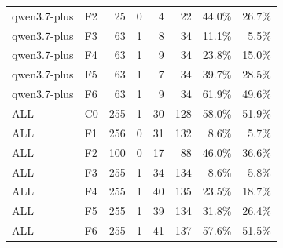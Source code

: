\begin{tabular}{llrrrrrr}
qwen3.7-plus & F2 & 25 & 0 & 4 & 22 & 44.0\% & 26.7\% \\
qwen3.7-plus & F3 & 63 & 1 & 8 & 34 & 11.1\% & 5.5\% \\
qwen3.7-plus & F4 & 63 & 1 & 9 & 34 & 23.8\% & 15.0\% \\
qwen3.7-plus & F5 & 63 & 1 & 7 & 34 & 39.7\% & 28.5\% \\
qwen3.7-plus & F6 & 63 & 1 & 9 & 34 & 61.9\% & 49.6\% \\
ALL & C0 & 255 & 1 & 30 & 128 & 58.0\% & 51.9\% \\
ALL & F1 & 256 & 0 & 31 & 132 & 8.6\% & 5.7\% \\
ALL & F2 & 100 & 0 & 17 & 88 & 46.0\% & 36.6\% \\
ALL & F3 & 255 & 1 & 34 & 134 & 8.6\% & 5.8\% \\
ALL & F4 & 255 & 1 & 40 & 135 & 23.5\% & 18.7\% \\
ALL & F5 & 255 & 1 & 39 & 134 & 31.8\% & 26.4\% \\
ALL & F6 & 255 & 1 & 41 & 137 & 57.6\% & 51.5\% \\
\bottomrule
\end{tabular}

